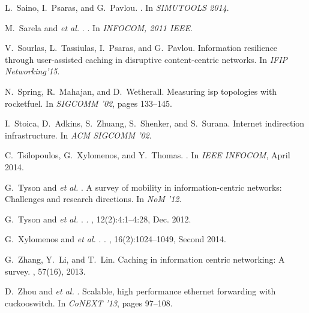 \documentclass{sig-alternate}
\newcommand{\etal}{{\em et al. \/}}
\begin{document}
\begin{thebibliography}{10}
L.~Saino, I.~Psaras, and G.~Pavlou.
.
\newblock In {\em SIMUTOOLS 2014}.

\vfill\eject

M.~Sarela and \etal.
.
\newblock In {\em INFOCOM, 2011 IEEE}.

V.~Sourlas, L.~Tassiulas, I.~Psaras, and G.~Pavlou.
\newblock Information resilience through user-assisted caching in disruptive
  content-centric networks.
\newblock In {\em IFIP Networking'15}.

N.~Spring, R.~Mahajan, and D.~Wetherall.
\newblock Measuring isp topologies with rocketfuel.
\newblock In {\em SIGCOMM '02}, pages 133--145.

I.~Stoica, D.~Adkins, S.~Zhuang, S.~Shenker, and S.~Surana.
\newblock Internet indirection infrastructure.
\newblock In {\em ACM SIGCOMM '02}.

C.~Tsilopoulos, G.~Xylomenos, and Y.~Thomas.
.
\newblock In {\em IEEE INFOCOM}, April 2014.

G.~Tyson and \etal.
\newblock A survey of mobility in information-centric networks: Challenges and
  research directions.
\newblock In {\em NoM '12}.

G.~Tyson and \etal.
.
, 12(2):4:1--4:28, Dec. 2012.

G.~Xylomenos and \etal.
.
, 16(2):1024--1049,
  Second 2014.

G.~Zhang, Y.~Li, and T.~Lin.
\newblock Caching in information centric networking: A survey.
, 57(16), 2013.

D.~Zhou and \etal.
\newblock Scalable, high performance ethernet forwarding with cuckooswitch.
\newblock In {\em CoNEXT '13}, pages 97--108.

\end{thebibliography}
 
  
\end{document}
